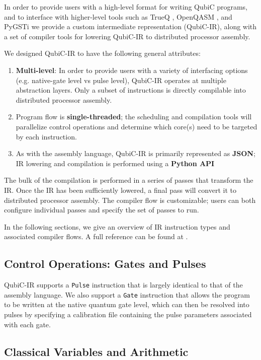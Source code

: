 \documentclass[journal]{IEEEtran}
\begin{document}
In order to provide users with a high-level format for writing QubiC programs, and to interface with higher-level tools such as TrueQ \cite{trueq}, OpenQASM \cite{cross2022openqasm}, and PyGSTi \cite{nielsen2020probing} we provide a custom intermediate representation (QubiC-IR), along with a set of compiler tools for lowering QubiC-IR to distributed processor assembly. 

We designed QubiC-IR to have the following general attributes:
\begin{enumerate}
    \item \textbf{Multi-level}: In order to provide users with a variety of interfacing options (e.g. native-gate level vs pulse level), QubiC-IR operates at multiple abstraction layers. Only a subset of instructions is directly compilable into distributed processor assembly.
    \item Program flow is \textbf{single-threaded}; the scheduling and compilation tools will parallelize control operations and determine which core(s) need to be targeted by each instruction.
    \item As with the assembly language, QubiC-IR is primarily represented as \textbf{JSON}; IR lowering and compilation is performed using a \textbf{Python API}
\end{enumerate}

The bulk of the compilation is performed in a series of passes that transform the IR. Once the IR has been sufficiently lowered, a final pass will convert it to distributed processor assembly. The compiler flow is customizable; users can both configure individual passes and specify the set of passes to run.

In the following sections, we give an overview of IR instruction types and associated compiler flows. A full reference can be found at \cite{qubicirref}.

\subsection{Control Operations: Gates and Pulses}

QubiC-IR supports a \verb|Pulse| instruction that is largely identical to that of the assembly language. We also support a \verb|Gate| instruction that allows the program to be written at the native quantum gate level, which can then be resolved into pulses by specifying a calibration file containing the pulse parameters associated with each gate.

\subsection{Classical Variables and Arithmetic}
\end{document}

